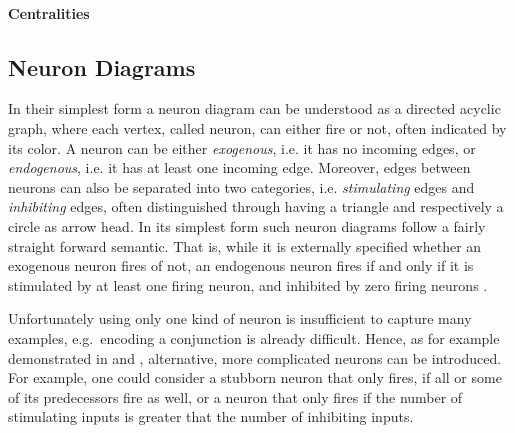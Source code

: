 \documentclass[11pt,a4paper]{book}
\theoremstyle{definition}
\theoremstyle{definition}
\theoremstyle{definition}
\theoremstyle{remark}
\begin{document}
\paragraph{Centralities}




\subsection{Neuron Diagrams}
\label{subsec:neuron_diagrams}
In their simplest form a neuron diagram can be understood as a directed acyclic graph, where each vertex, called neuron, can either fire or not, often indicated by its color. A neuron can be either \emph{exogenous}, i.e. it has no incoming edges, or \emph{endogenous}, i.e. it has at least one incoming edge. Moreover, edges between neurons can also be separated into two categories, i.e. \emph{stimulating} edges and \emph{inhibiting} edges, often distinguished through having a triangle and respectively a circle as arrow head. 
In its simplest form such neuron diagrams follow a fairly straight forward semantic. That is, while it is externally specified whether an exogenous neuron fires of not, an endogenous neuron fires if and only if it is stimulated by at least one firing neuron, and inhibited by zero firing neurons \cite{hitchcock2009structural,erwig2010causal,baumgartner2013regularity}. 

Unfortunately using only one kind of neuron is insufficient to capture many examples, e.g.\ encoding a conjunction is already difficult.
Hence, as for example demonstrated in \cite{hitchcock2009structural} and \cite{baumgartner2013regularity}, alternative, more complicated neurons can be introduced. For example, one could consider a stubborn neuron that only fires, if all or some of its predecessors fire as well, or a neuron that only fires if the number of stimulating inputs is greater that the number of inhibiting inputs.
\end{document}
